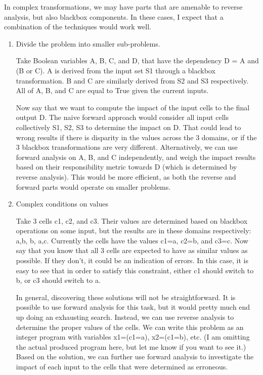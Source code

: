 In complex transformations, we may have parts that are amenable to reverse analysis, but also blackbox components. In these cases, I expect that a combination of the techniques would work well. 

\begin{enumerate}
	\item Divide the problem into smaller sub-problems.
	
	Take Boolean variables A, B, C, and D, that have the dependency D = A and (B or C).
	A is derived from the input set S1 through a blackbox transformation. B and C are similarly derived from S2 and S3 respectively. All of A, B, and C are equal to True given the current inputs.

	Now say that we want to compute the impact of the input cells to the final output D. The naive forward approach would consider all input cells collectively {S1, S2, S3} to determine the impact on D. That could lead to wrong results if there is disparity in the values across the 3 domains, or if the 3 blackbox transformations are very different. Alternatively, we can use forward analysis on A, B, and C independently, and weigh the impact results based on their responsibility metric towards D (which is determined by reverse analysis). This would be more efficient, as both the reverse and forward parts would operate on smaller problems.
	
	\item Complex conditions on values
	
	
	Take 3 cells c1, c2, and c3. Their values are determined based on blackbox operations on some input, but the results are in these domains respectively: {a,b}, {b}, {a,c}. Currently the cells have the values c1=a, c2=b, and c3=c. Now say that you know that all 3 cells are expected to have as similar values as possible. If they don't, it could be an indication of errors. In this case, it is easy to see that in order to satisfy this constraint, either c1 should switch to b, or c3 should switch to a. 

	In general, discovering these solutions will not be straightforward. It is possible to use forward analysis for this task, but it would pretty much end up doing an exhausting search. Instead, we can use reverse analysis to determine the proper values of the cells. We can write this problem as an integer program with variables x1=(c1=a), x2=(c1=b), etc. (I am omitting the actual produced program here, but let me know if you want to see it.)
	Based on the solution, we can further use forward analysis to investigate the impact of each input to the cells that were determined as erroneous.
	

\end{enumerate}

